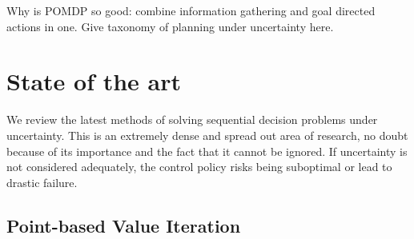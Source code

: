 Why is POMDP so good: combine information gathering and goal directed actions in one. Give taxonomy of planning under uncertainty here.

\section{State of the art}

We review the latest methods of solving sequential decision problems under uncertainty. This is an extremely dense and spread out 
area of research, no doubt because of its importance and the fact that it cannot be ignored. If uncertainty is not considered 
adequately, the control policy risks being suboptimal or lead to drastic failure. 




\subsection{Point-based Value Iteration}

